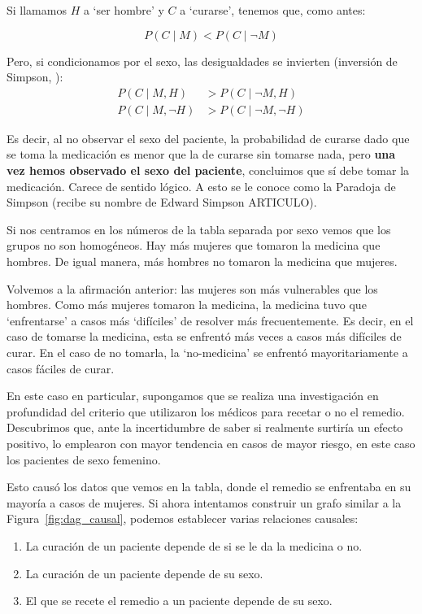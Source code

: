 \documentclass[a4paper,11pt,spanish, twoside]{tfg-uam-matematicas_25-26}
\theoremstyle{definition}
\begin{document}
Si llamamos $H$ a `ser hombre' y $C$ a `curarse', tenemos que, como antes:

\begin{equation*}
    P(C\mid M) < P(C\mid \neg M)
\end{equation*}

Pero, si condicionamos por el sexo, las desigualdades se invierten (inversión de Simpson, \cite{pearl2013simpson}):
\begin{align*}
    P(C\mid M, H) &> P(C\mid \neg M, H) \\
    P(C\mid M, \neg H) &> P(C\mid \neg M, \neg H)
\end{align*}

Es decir, al no observar el sexo del paciente, la probabilidad de curarse dado que se toma la medicación es menor que la de curarse sin tomarse nada, pero \textbf{una vez hemos observado el sexo del paciente}, concluimos que sí debe tomar la medicación. Carece de sentido lógico. A esto se le conoce como la Paradoja de Simpson (recibe su nombre de Edward Simpson ARTICULO).

Si nos centramos en los números de la tabla separada por sexo vemos que los grupos no son homogéneos. Hay más mujeres que tomaron la medicina que hombres. De igual manera, más hombres no tomaron la medicina que mujeres.

Volvemos a la afirmación anterior: las mujeres son más vulnerables que los hombres. Como más mujeres tomaron la medicina, la medicina tuvo que `enfrentarse' a casos más `difíciles' de resolver más frecuentemente. Es decir, en el caso de tomarse la medicina, esta se enfrentó más veces a casos más difíciles de curar. En el caso de no tomarla, la `no-medicina' se enfrentó mayoritariamente a casos fáciles de curar.

En este caso en particular, supongamos que se realiza una investigación en profundidad del criterio que utilizaron los médicos para recetar o no el remedio. Descubrimos que, ante la incertidumbre de saber si realmente surtiría un efecto positivo, lo emplearon con mayor tendencia en casos de mayor riesgo, en este caso los pacientes de sexo femenino.

Esto causó los datos que vemos en la tabla, donde el remedio se enfrentaba en su mayoría a casos de mujeres. Si ahora intentamos construir un grafo similar a la Figura~\ref{fig:dag_causal}, podemos establecer varias relaciones causales:

\begin{enumerate}
    \item La curación de un paciente depende de si se le da la medicina o no.
    \item La curación de un paciente depende de su sexo.
    \item El que se recete el remedio a un paciente depende de su sexo.
\end{enumerate}
\end{document}
